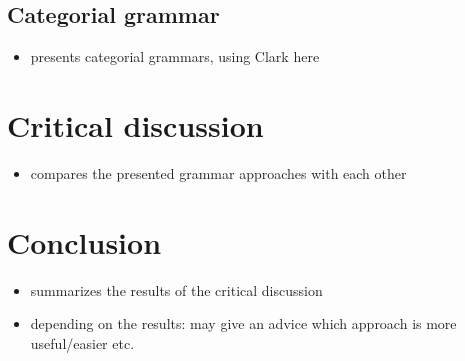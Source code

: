 \documentclass[10pt,a4paper,oneside,english,numbers=noenddot,titlepage]{scrartcl}
\begin{document}
	\subsection{Categorial grammar}
		\begin{itemize}
			\item	presents categorial grammars, using Clark\cite{Clark2004} here
		\end{itemize}
		
\section{Critical discussion}
	\begin{itemize}
		\item	compares the presented grammar approaches with each other
	\end{itemize}
	
\section{Conclusion}
	 \begin{itemize}
	 	\item	summarizes the results of the critical discussion
	 	\item	depending on the results: may give an advice which approach is more useful/easier etc.
	 \end{itemize}

\clearpage



\end{document}
